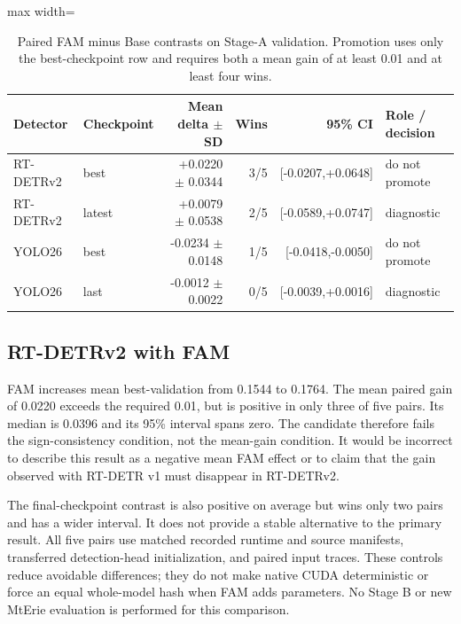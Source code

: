 \begin{table}[htbp]
  \centering
  \caption{Paired FAM minus Base contrasts on Stage-A validation.
  Promotion uses only the best-checkpoint row and requires both a mean gain
  of at least 0.01 and at least four wins.}
  \label{tab:detector-stage-a-deltas}
  \begin{adjustbox}{max width=\textwidth}
  \begin{tabular}{llrrrl}
    \toprule
    Detector & Checkpoint & Mean delta \(\pm\) SD & Wins & 95\% CI & Role / decision \\
    \midrule
    RT-DETRv2 & best & +0.0220 \(\pm\) 0.0344 & 3/5 & [-0.0207,+0.0648] & do not promote \\
    RT-DETRv2 & latest & +0.0079 \(\pm\) 0.0538 & 2/5 & [-0.0589,+0.0747] & diagnostic \\
    YOLO26 & best & -0.0234 \(\pm\) 0.0148 & 1/5 & [-0.0418,-0.0050] & do not promote \\
    YOLO26 & last & -0.0012 \(\pm\) 0.0022 & 0/5 & [-0.0039,+0.0016] & diagnostic \\
    \bottomrule
  \end{tabular}
  \end{adjustbox}
\end{table}

\subsection{RT-DETRv2 with FAM}

FAM increases mean best-validation \mapfifty{} from 0.1544 to 0.1764.
The mean paired gain of 0.0220 exceeds the required 0.01, but is positive in
only three of five pairs. Its median is 0.0396 and its 95\% interval spans
zero. The candidate therefore fails the sign-consistency condition, not the
mean-gain condition. It would be incorrect to describe this result as a
negative mean FAM effect or to claim that the gain observed with RT-DETR v1
must disappear in RT-DETRv2.

The final-checkpoint contrast is also positive on average but wins only two
pairs and has a wider interval. It does not provide a stable alternative to
the primary result. All five pairs use matched recorded runtime and source
manifests, transferred detection-head initialization, and paired input traces.
These controls reduce avoidable differences; they do not make native CUDA
deterministic or force an equal whole-model hash when FAM adds parameters.
No Stage B or new MtErie evaluation is performed for this comparison.

